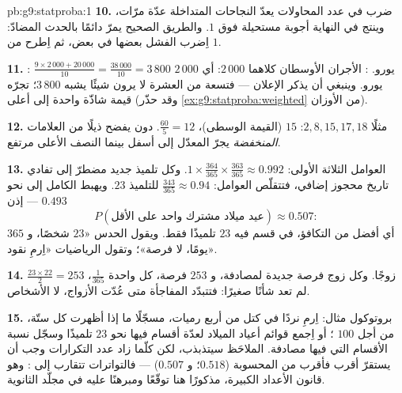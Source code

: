 \begin{solution}{pb:g9:statproba:1}
\textbf{10.} ضرب  في عدد المحاولات يعدّ النجاحات
المتداخلة عدّة مرّات، وينتج في النهاية أجوبة مستحيلة فوق $1$.
والطريق الصحيح يمرّ دائمًا بالحدث المضادّ: اِضرب 
الفشل بعضها في بعض، ثم اِطرح من $1$.

\textbf{11.} : $\frac{9 \times 2\,000 + 20\,000}{10} =
\frac{38\,000}{10} = 3\,800$ يورو. : الأجران الأوسطان
كلاهما $2\,000$: أي  $2\,000$ يورو. وينبغي أن يذكر
الإعلان  --- فتسعة من العشرة لا يرون شيئًا يشبه
$3\,800$؛  تجرّه قيمة شاذّة واحدة إلى أعلى
(وقد حذّر \cref{ex:g9:statproba:weighted} من الأوزان).

\textbf{12.} مثلًا $2, 8, 15, 17, 18$:  $15$
(القيمة الوسطى)،  $\frac{60}{5} = 12$.  دون
 يفضح ذيلًا من العلامات \emph{المنخفضة} يجرّ المعدّل إلى
أسفل بينما النصف الأعلى مرتفع.

\textbf{13.} العوامل الثلاثة الأولى:
$1 \times \frac{364}{365} \times \frac{363}{365} \approx
0.992$. وكل تلميذ جديد مضطرّ إلى تفادي تاريخ محجوز إضافي،
فتتقلّص العوامل: $\frac{343}{365} \approx 0.94$ للتلميذ
$23$. ويهبط  الكامل إلى نحو $0.493$ --- إذن
\[
P(\text{عيد ميلاد مشترك واحد على الأقل}) \approx 0.507 :
\]
أي أفضل من التكافؤ، في قسم فيه $23$ تلميذًا فقط. ويقول الحدس
«$23$ شخصًا، و $365$ يومًا، لا فرصة»؛ وتقول الرياضيات «اِرمِ
 نقود».

\textbf{14.} $\frac{23 \times 22}{2} = 253$ زوجًا. وكل زوج فرصة
جديدة لمصادفة، و $253$ فرصة، كل واحدة $\frac{1}{365}$، لم تعد
شأنًا صغيرًا: فتتبدّد المفاجأة متى عُدّت الأزواج، لا الأشخاص.

\textbf{15.} بروتوكول مثال: اِرمِ نردًا في كتل من أربع رميات،
مسجّلًا ما إذا أظهرت كل  ستّة، من أجل $100$ ؛ أو اِجمع
قوائم أعياد الميلاد لعدّة أقسام فيها نحو $23$ تلميذًا وسجّل
نسبة الأقسام التي فيها مصادفة.  الملاحَظ سيتذبذب،
لكن كلّما زاد عدد التكرارات وجب أن يستقرّ أقرب فأقرب من
 المحسوبة ($0.518$؛ و $0.507$) --- فالتواترات
تتقارب إلى : وهو قانون الأعداد الكبيرة، مذكورًا هنا
توقّعًا ومبرهنًا عليه في مجلّد الثانوية.
\end{solution}
